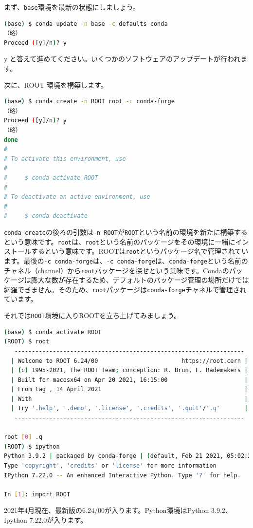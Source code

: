 {まず、\texttt{base}環境を最新の状態にしましょう。
\begin{lstlisting}[language=bash]
(base) $ conda update -n base -c defaults conda
（略）
Proceed ([y]/n)? y
\end{lstlisting}
y と答えて進めてください。いくつかのソフトウェアのアップデートが行われます。

次に、ROOT 環境を構築します。
\begin{lstlisting}[language=bash]
(base) $ conda create -n ROOT root -c conda-forge
（略）
Proceed ([y]/n)? y
（略）
done
#
# To activate this environment, use
#
#     $ conda activate ROOT
#
# To deactivate an active environment, use
#
#     $ conda deactivate
\end{lstlisting}

\texttt{conda create}の後ろの引数は\texttt{-n ROOT}が\texttt{ROOT}という名前の環境を新たに構築するという意味です。\texttt{root}は、\texttt{root}という名前のパッケージをその環境に一緒にインストールするという意味です。ROOTは\texttt{root}というパッケージ名で管理されています。最後の\texttt{-c conda-forge}は、\texttt{-c conda-forge}は、\texttt{conda-forge}という名前のチャネル（channel）から\texttt{root}パッケージを探せという意味です。Condaのパッケージは膨大な数が存在するため、デフォルトのパッケージ管理の場所だけでは網羅できません。そのため、\texttt{root}パッケージは\texttt{conda-forge}チャネルで管理されています。

それでは\texttt{ROOT}環境に入りROOTを立ち上げてみましょう。
\begin{lstlisting}[language=bash]
(base) $ conda activate ROOT
(ROOT) $ root
   ------------------------------------------------------------------
  | Welcome to ROOT 6.24/00                        https://root.cern |
  | (c) 1995-2021, The ROOT Team; conception: R. Brun, F. Rademakers |
  | Built for macosx64 on Apr 20 2021, 16:15:00                      |
  | From tag , 14 April 2021                                         |
  | With                                                             |
  | Try '.help', '.demo', '.license', '.credits', '.quit'/'.q'       |
   ------------------------------------------------------------------

root [0] .q
(ROOT) $ ipython
Python 3.9.2 | packaged by conda-forge | (default, Feb 21 2021, 05:02:20) 
Type 'copyright', 'credits' or 'license' for more information
IPython 7.22.0 -- An enhanced Interactive Python. Type '?' for help.

In [1]: import ROOT
\end{lstlisting}
2021年4月現在、最新版の6.24/00が入ります。Python環境はPython 3.9.2、Ipython 7.22.0が入ります。

}

